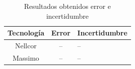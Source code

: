 \documentclass[journal]{IEEEtran}
\begin{document}
	\begin{table}[h!]
	\centering
	
	\caption{Resultados obtenidos error e incertidumbre
	}
	\def\arraystretch{1.2}%
	\begin{tabular}{c c l}
		
		\hline
		\textbf{Tecnología} & \multicolumn{1}{c}{\textbf{Error}} & \textbf{Incertidumbre}	\\ 
		\hline
		Nellcor  &--	& --\\
		Massimo  &--	& --\\		

		
		\hline
	\end{tabular}%
	\label{cuadro:resultados_sn_sp}%
\end{table}%




%
%
%
\end{document}
